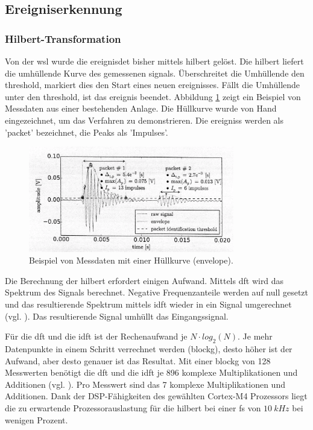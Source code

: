 \subsection{Ereigniserkennung}\label{subsec.sw_ereignis}
\subsubsection{Hilbert-Transformation}
Von der \gls{wsl} wurde die \gls{ereignisdet} bisher mittels \gls{hilbert} gelöst. Die \gls{hilbert} liefert die umhüllende Kurve des gemessenen \gls{signal}s. Überschreitet die Umhüllende den \gls{threshold}, markiert dies den Start eines neuen \gls{ereignis}ses. Fällt die Umhüllende unter den \gls{threshold}, ist das \gls{ereignis} beendet. Abbildung \ref{fig.wslcurve} zeigt ein Beispiel von Messdaten aus einer bestehenden Anlage. Die Hüllkurve wurde von Hand eingezeichnet, um das Verfahren zu demonstrieren. Die \glspl{ereignis} werden als 'packet' bezeichnet, die Peaks als 'Impulses'.

\begin{figure}
	\centering
		\includegraphics[width=0.8\textwidth]{images/curve_wsl.png}
	\caption{Beispiel von Messdaten mit einer Hüllkurve (envelope).}
	\label{fig.wslcurve}
\end{figure}

Die Berechnung der \gls{hilbert} erfordert einigen Aufwand. Mittels \gls{dft} wird das Spektrum des Signals berechnet. Negative Frequenzanteile werden auf null gesetzt und das resultierende Spektrum mittels \gls{idft} wieder in ein Signal umgerechnet (vgl. \cite{wiki_hilbert}). Das resultierende Signal umhüllt das Eingangssignal. 

Für die \gls{dft} und die \gls{idft} ist der Rechenaufwand je \ensuremath{N \cdot log_2(N)}. Je mehr Datenpunkte in einem Schritt verrechnet werden (\gls{blockg}), desto höher ist der Aufwand, aber desto genauer ist das Resultat. Mit einer \gls{blockg} von 128 Messwerten benötigt die \gls{dft} und die \gls{idft} je 896 komplexe Multiplikationen und Additionen (vgl. \cite[Kap. 3, S. 48]{dsv1_hilbert}). Pro Messwert sind das 7 komplexe Multiplikationen und Additionen. Dank der DSP-Fähigkeiten des gewählten Cortex\texttrademark -M4 Prozessors liegt die zu erwartende Prozessorauslastung für die \gls{hilbert} bei einer \gls{fs} von \ensuremath{10~kHz} bei wenigen Prozent.

